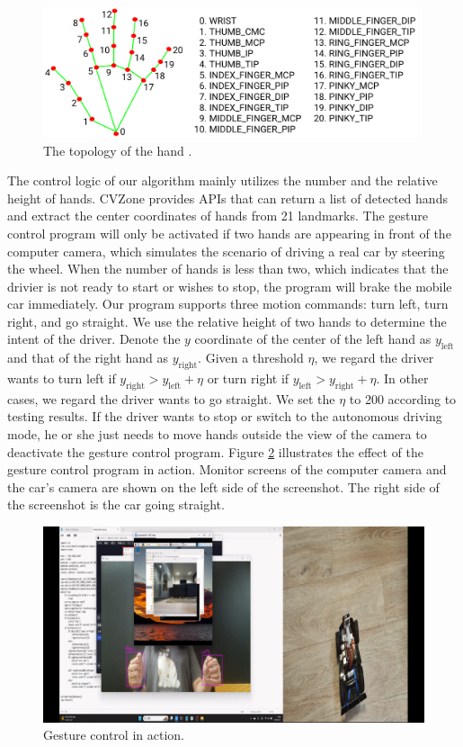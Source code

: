 \documentclass[acmsmall]{acmart}
\begin{document}
\begin{figure}[!ht]
    \centering
    \includegraphics[width=11cm]{./hand.png}
    \caption{The topology of the hand \cite{google}.}
    \label{fig:hand}
\end{figure}

The control logic of our algorithm mainly utilizes the number and the relative height of hands. CVZone provides APIs that can return a list of detected hands and extract the center coordinates of hands from 21 landmarks. The gesture control program will only be activated if two hands are appearing in front of the computer camera, which simulates the scenario of driving a real car by steering the wheel. When the number of hands is less than two, which indicates that the drivier is not ready to start or wishes to stop, the program will brake the mobile car immediately. Our program supports three motion commands: turn left, turn right, and go straight. We use the relative height of two hands to determine the intent of the driver. Denote the $y$ coordinate of the center of the left hand as $y_{\text{left}}$ and that of the right hand as $y_{\text{right}}$. Given a threshold $\eta$, we regard the driver wants to turn left if $y_{\text{right}} > y_{\text{left}} + \eta$ or turn right if $y_{\text{left}} > y_{\text{right}} + \eta$. In other cases, we regard the driver wants to go straight. We set the $\eta$ to 200 according to testing results. If the driver wants to stop or switch to the autonomous driving mode, he or she just needs to move hands outside the view of the camera to deactivate the gesture control program. Figure \ref{fig:gesture-control} illustrates the effect of the gesture control program in action. Monitor screens of the computer camera and the car's camera are shown on the left side of the screenshot. The right side of the screenshot is the car going straight.
\begin{figure}[!ht]
    \centering
    \includegraphics[width=13cm]{./gesture-control.png}
    \caption{Gesture control in action.}
    \label{fig:gesture-control}
\end{figure}
\end{document}
